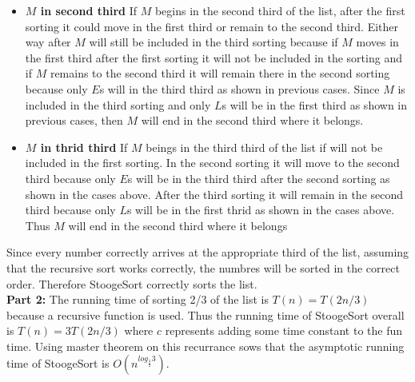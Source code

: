\documentclass[11pt]{article}
\begin{document}
\begin{itemize}
\item \textbf{$M$ in second third}  If $M$ begins in the second third of the list, after the first sorting it could move in the first third or remain to the second third. Either way after $M$ will still be included in the third sorting because if $M$ moves in the first third after the first sorting it will not be included in the sorting and if $M$ remains to the second third it will remain there in the second sorting because only $E$s will in the third third as shown in previous cases. Since $M$ is included in the third sorting and only $L$s will be in the first third as shown in previous cases, then $M$ will end in the second third where it belongs.
\item \textbf{$M$ in thrid third} If $M$ beings in the third third of the list if will not be included in the first sorting. In the second sorting it will move to the second third because only $E$s will be in the third third after the second sorting as shown in the cases above. After the third sorting it will remain in the second third because only $L$s will be in the first thrid as shown in the cases above. Thus $M$ will end in the second third where it belongs
\end{itemize}
Since every number correctly arrives at the appropriate third of the list, assuming that the recursive sort works correctly, the numbres will be sorted in the correct order. Therefore StoogeSort correctly sorts the list.\\
\textbf{Part 2:} The running time of sorting 2/3 of the list is $ T(n) = T(2n/3)$ because a recursive function is used. Thus the running time of StoogeSort overall is $T(n)=3T(2n/3)$ where $c$ represents adding some time constant to the fun time. Using master theorem on this recurrance sows that the asymptotic running time of StoogeSort is $O(n^{log_{\frac{3}{2}} 3})$.\\
\end{document}
